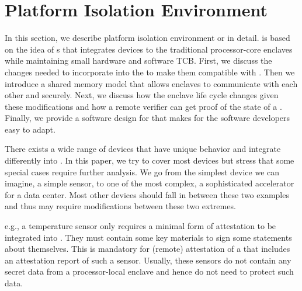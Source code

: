 \section{Platform Isolation Environment}
\label{sec:approach}

In this section, we describe platform isolation environment or \name in detail. \name is based on the idea of \nameenclave{}s that integrates \sphw devices to the traditional processor-core enclaves while maintaining small hardware and software TCB. First, we discuss the changes needed to incorporate into the \sphw to make them compatible with \name. Then we introduce a shared memory model that allows enclaves to communicate with each other and \sphw securely. Next, we discuss how the enclave life cycle changes given these modifications and how a remote verifier can get proof of the state of a \nameenclave{}. Finally, we provide a software design for \name that makes \name for the software developers easy to adapt.



 There exists a wide range of \sphw{} devices that have unique behavior and integrate differently into \name{}.  In this paper, we try to cover most devices but stress that some special cases require further analysis. We go from the simplest \sphw device we can imagine, a simple sensor, to one of the most complex, a sophisticated accelerator for a data center. Most other \sphw devices should fall in between these two examples and thus may require modifications between these two extremes. 

 e.g., a temperature sensor only requires a minimal form of attestation to be integrated into \name{}. They must contain some key materials to sign some statements about themselves. This is mandatory for (remote) attestation of a \nameenclave that includes an attestation report of such a sensor. Usually, these sensors do not contain any secret data from a processor-local enclave and hence do not need to protect such data.

